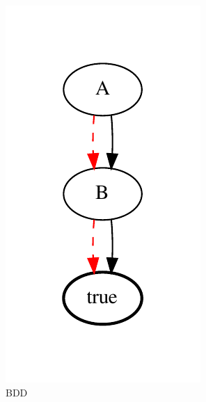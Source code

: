 \documentclass[a4paper,11pt]{article}
\begin{document}
\begin{figure}[!htb]
\begin{minipage}{0.25\textwidth}
    \includegraphics[width=1\linewidth]{tests_rapport/test2_bdd.pdf}
    \caption*{BDD}
  \end{minipage}\hfill
  \begin{minipage}{0.24\textwidth}
    \centering

\end{minipage}
\end{figure}
\end{document}
